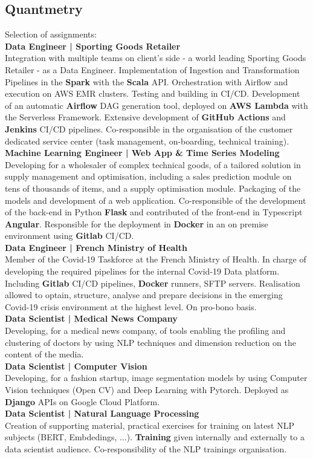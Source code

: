 \documentclass{article}
\newcommand{\longdescript}[1]{\color{subheadings}\normalfont\small {#1\\}}
\newcommand{\experience}[1]{\color{darkgray}\normalfont \textbf{#1\\}}
\newcommand{\experiencedescript}[1]{\color{subheadings}\normalfont\small {#1\\[3pt]}}
\newcommand{\location}[1]{\color{primary}\headingfont {\hfill #1\\} }
\newcommand{\sectionsep}[0]{\vspace{-6pt}}
\newcommand{\pipe}{\hspace{1pt} | \hspace{1pt} }
\begin{document}
\subsection{Quantmetry}
\location{Paris, France | Sept 2019 - Today}
\longdescript{Selection of assignments:}
\experience{Data Engineer \pipe Sporting Goods Retailer}
\experiencedescript{Integration with multiple teams on client's side - a world leading Sporting Goods Retailer - as a Data Engineer. Implementation of Ingestion and Transformation Pipelines in the \textbf{Spark} with the \textbf{Scala} API. Orchestration with Airflow and execution on AWS EMR clusters. Testing and building in CI/CD. Development of an automatic \textbf{Airflow} DAG generation tool, deployed on \textbf{AWS Lambda} with the Serverless Framework. Extensive development of \textbf{GitHub Actions} and \textbf{Jenkins} CI/CD pipelines. Co-responsible in the organisation of the customer dedicated service center (task management, on-boarding, technical training). }
\experience{Machine Learning Engineer \pipe Web App \& Time Series Modeling}
\experiencedescript{Developing for a wholesaler of complex technical goods, of a tailored solution in supply management and optimisation, including a sales prediction module on tens of thousands of items, and a supply optimisation module. Packaging of the models and development of a web application. Co-responsible of the development of the back-end in Python \textbf{Flask} and contributed of the front-end in Typescript \textbf{Angular}. Responsible for the deployment in \textbf{Docker} in an on premise environment using \textbf{Gitlab} CI/CD.}
\experience{Data Engineer \pipe French Ministry of Health }
\experiencedescript{Member of the Covid-19 Taskforce at the French Ministry of Health. In charge of developing the required pipelines for the internal Covid-19 Data platform. Including \textbf{Gitlab} CI/CD pipelines, \textbf{Docker} runners, SFTP servers. Realisation allowed to optain, structure, analyse and prepare decisions in the emerging Covid-19 crisis environment at the highest level. On pro-bono basis.}
\experience{Data Scientist \pipe Medical News Company }
\experiencedescript{Developing, for a medical news company, of tools enabling the profiling and clustering of doctors by using NLP techniques and dimension reduction on the content of the media.}
\experience{Data Scientist \pipe Computer Vision}
\experiencedescript{Developing, for a fashion startup, image segmentation models by using Computer Vision techniques (Open CV) and Deep Learning with Pytorch. Deployed as \textbf{Django} APIs on Google Cloud Platform.}
\experience{Data Scientist \pipe Natural Language Processing}
\experiencedescript{Creation of supporting material, practical exercises for training on latest NLP subjects (BERT, Embdedings,  ...). \textbf{Training} given internally and externally to a data scientist audience. Co-responsibility of the NLP trainings organisation.}
\sectionsep
\end{document}
